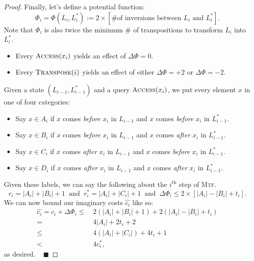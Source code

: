 \begin{proof}
    Finally, let's define a potential function:
    \[ \Phi_i = \Phi(L_i, L_i^*) := 2 \times [ \text{\# of inversions between $L_i$ and $L_i^*$} ]. \]
    Note that $\Phi_i$ is also twice the minimum \# of transpositions to transform $L_i$ into $L_i^*$.
    \begin{itemize}
        \item Every $\textsc{Access}(x_i)$ yields an effect of $\Delta \Phi = 0$.
        \item Every $\textsc{Transpose}(i)$ yields an effect of either $\Delta \Phi = +2$ or $\Delta \Phi = -2$.
    \end{itemize}
    Given a state $(L_{i - 1}, L_{i - 1}^*)$ and a query $\textsc{Access}(x_i)$, we put every element $x$ in one of four categories:
    \begin{itemize}
        \item Say $x \in A_i$ if $x$ comes \emph{before} $x_i$ in $L_{i - 1}$ and $x$ comes \emph{before} $x_i$ in $L_{i - 1}^*$.
        \item Say $x \in B_i$ if $x$ comes \emph{before} $x_i$ in $L_{i - 1}$ and $x$ comes \emph{after} $x_i$ in $L_{i - 1}^*$.
        \item Say $x \in C_i$ if $x$ comes \emph{after} $x_i$ in $L_{i - 1}$ and $x$ comes \emph{before} $x_i$ in $L_{i - 1}^*$.
        \item Say $x \in D_i$ if $x$ comes \emph{after} $x_i$ in $L_{i - 1}$ and $x$ comes \emph{after} $x_i$ in $L_{i - 1}^*$.
    \end{itemize}
    Given these labels, we can say the following about the $i^{\text{th}}$ step of \textsc{Mtf}.
    \[ r_i = |A_i| + |B_i| + 1 ~ \text{ and } ~ r_i^* = |A_i| + |C_i| + 1 ~ \text{ and } ~ \Delta \Phi_i \leq 2 \times [|A_i| - |B_i| + t_i]. \]
    We can now bound our imaginary costs $\hat{c_i}$ like so:
    \begin{align*}
        \hat{c_i} = c_i+ \Delta \Phi_i \leq \ & 2(|A_i| + |B_i| + 1) + 2(|A_i| - |B_i| + t_i) \\
        = \ & 4|A_i| + 2t_i + 2 \\
        \leq \ & 4(|A_i| + |C_i|) + 4t_i + 1 \\
        < \ & 4c_i^*,
    \end{align*}
    as desired. ~ $\blacksquare$
\end{proof}

